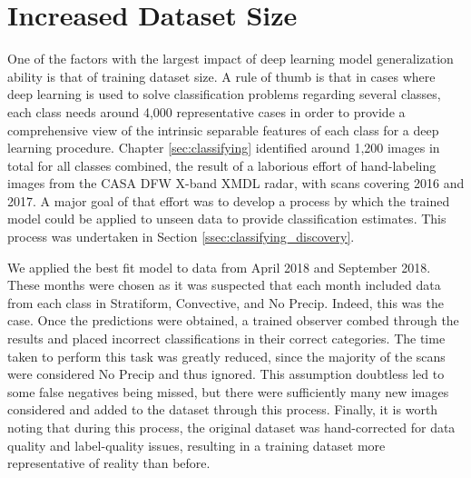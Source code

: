 \section{Increased Dataset Size}
\label{sec:bestmodel_dataset}

One of the factors with the largest impact of deep learning model generalization ability is that of training dataset size.
A rule of thumb is that in cases where deep learning is used to solve classification problems regarding several classes, each class needs around 4,000 representative cases in order to provide a comprehensive view of the intrinsic separable features of each class for a deep learning procedure.
Chapter \ref{sec:classifying} identified around 1,200 images in total for all classes combined, the result of a laborious effort of hand-labeling images from the CASA DFW X-band XMDL radar, with scans covering 2016 and 2017.
A major goal of that effort was to develop a process by which the trained model could be applied to unseen data to provide classification estimates.
This process was undertaken in Section \ref{ssec:classifying_discovery}.

We applied the best fit model to data from April 2018 and September 2018.
These months were chosen as it was suspected that each month included data from each class in Stratiform, Convective, and No Precip.
Indeed, this was the case.
Once the predictions were obtained, a trained observer combed through the results and placed incorrect classifications in their correct categories.
The time taken to perform this task was greatly reduced, since the majority of the scans were considered No Precip and thus ignored.
This assumption doubtless led to some false negatives being missed, but there were sufficiently many new images considered and added to the dataset through this process.
Finally, it is worth noting that during this process, the original dataset was hand-corrected for data quality and label-quality issues, resulting in a training dataset more representative of reality than before.


